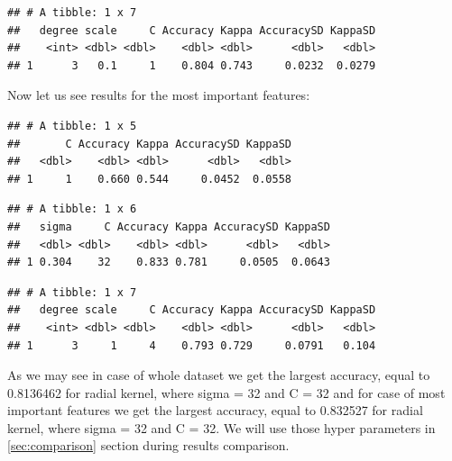 \documentclass[11pt,a4paper]{article}\usepackage[]{graphicx}\usepackage[]{xcolor}
\makeatletter
\newenvironment{kframe}{%
 \def\at@end@of@kframe{}%
 \ifinner\ifhmode%
  \def\at@end@of@kframe{\end{minipage}}%
  \begin{minipage}{\columnwidth}%
 \fi\fi%
 \def\FrameCommand##1{\hskip\@totalleftmargin \hskip-\fboxsep
 \colorbox{shadecolor}{##1}\hskip-\fboxsep
     \hskip-\linewidth \hskip-\@totalleftmargin \hskip\columnwidth}%
 \MakeFramed {\advance\hsize-\width
   \@totalleftmargin\z@ \linewidth\hsize
   \@setminipage}}%
 {\par\unskip\endMakeFramed%
 \at@end@of@kframe}
\newenvironment{knitrout}{}{} %
\makeatother
\begin{document}
	
\begin{knitrout}
\color{fgcolor}\begin{kframe}
\begin{verbatim}
## # A tibble: 1 x 7
##   degree scale     C Accuracy Kappa AccuracySD KappaSD
##    <int> <dbl> <dbl>    <dbl> <dbl>      <dbl>   <dbl>
## 1      3   0.1     1    0.804 0.743     0.0232  0.0279
\end{verbatim}
\end{kframe}
\end{knitrout}
	
	Now let us see results for the most important features:
	
\begin{knitrout}
\color{fgcolor}\begin{kframe}
\begin{verbatim}
## # A tibble: 1 x 5
##       C Accuracy Kappa AccuracySD KappaSD
##   <dbl>    <dbl> <dbl>      <dbl>   <dbl>
## 1     1    0.660 0.544     0.0452  0.0558
\end{verbatim}
\end{kframe}
\end{knitrout}
	
\begin{knitrout}
\color{fgcolor}\begin{kframe}
\begin{verbatim}
## # A tibble: 1 x 6
##   sigma     C Accuracy Kappa AccuracySD KappaSD
##   <dbl> <dbl>    <dbl> <dbl>      <dbl>   <dbl>
## 1 0.304    32    0.833 0.781     0.0505  0.0643
\end{verbatim}
\end{kframe}
\end{knitrout}
	
\begin{knitrout}
\color{fgcolor}\begin{kframe}
\begin{verbatim}
## # A tibble: 1 x 7
##   degree scale     C Accuracy Kappa AccuracySD KappaSD
##    <int> <dbl> <dbl>    <dbl> <dbl>      <dbl>   <dbl>
## 1      3     1     4    0.793 0.729     0.0791   0.104
\end{verbatim}
\end{kframe}
\end{knitrout}
	
	As we may see in case of whole dataset we get the largest accuracy, equal to 0.8136462 for radial kernel, where sigma = 32 and C = 32 and for case of most important features we get the largest accuracy, equal to 0.832527 for radial kernel, where sigma = 32 and C = 32. We will use those hyper parameters in \ref{sec:comparison} section during results comparison.
	
\end{document}

